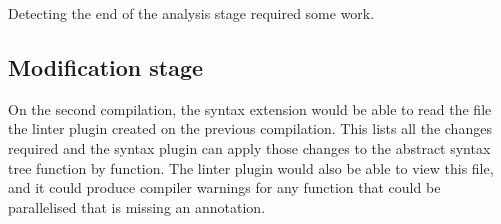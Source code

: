 \documentclass[conference]{IEEEtran}
\begin{document}
Detecting the end of the analysis stage required some work.

\subsection{Modification stage}
On the second compilation, the syntax extension would be able to read the file the linter plugin created on the previous compilation. This lists all the changes required and the syntax plugin can apply those changes to the abstract syntax tree function by function. The linter plugin would also be able to view this file, and it could produce compiler warnings for any function that could be parallelised that is missing an annotation.


\printbibliography
\end{document}
